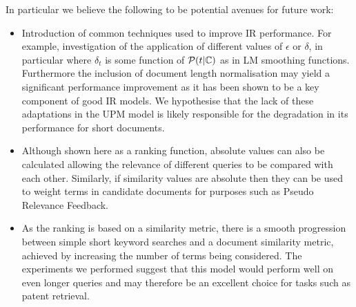 In particular we believe the following to be potential avenues for future work:
\begin{itemize}
\item Introduction of common techniques used to improve IR performance. For example, investigation of the application of different values of $\epsilon$ or $\delta$, in particular where $\delta_t$ is some function of $\mathcal{P}(t|\mathbb{C})$ as in LM smoothing functions. Furthermore the inclusion of document length normalisation may yield a significant performance improvement as it has been shown to be a key component of good IR models. We hypothesise that the lack of these adaptations in the UPM model is likely responsible for the degradation in its performance for short documents.
\item Although shown here as a ranking function, absolute values can also be calculated allowing the relevance of different queries to be compared with each other. Similarly, if similarity values are absolute then they can be used to weight terms in candidate documents for purposes such as Pseudo Relevance Feedback.
\item As the ranking is based on a similarity metric, there is a smooth progression between simple short keyword searches and a document similarity metric, achieved by increasing the number of terms being considered. The experiments we performed suggest that this model would perform well on even longer queries and may therefore be an excellent choice for tasks such as patent retrieval.
\end{itemize}